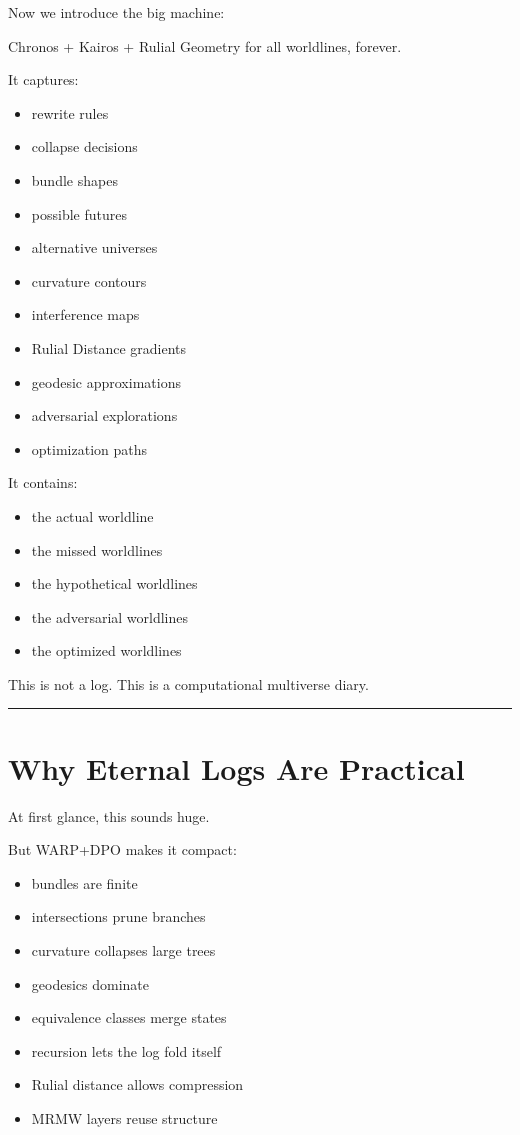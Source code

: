 Now we introduce the big machine:

Chronos + Kairos + Rulial Geometry for all worldlines, forever.

It captures:

\begin{itemize}
\tightlist
\item
  rewrite rules
\item
  collapse decisions
\item
  bundle shapes
\item
  possible futures
\item
  alternative universes
\item
  curvature contours
\item
  interference maps
\item
  Rulial Distance gradients
\item
  geodesic approximations
\item
  adversarial explorations
\item
  optimization paths
\end{itemize}

It contains:

\begin{itemize}
\tightlist
\item
  the actual worldline
\item
  the missed worldlines
\item
  the hypothetical worldlines
\item
  the adversarial worldlines
\item
  the optimized worldlines
\end{itemize}

This is not a log. This is a computational multiverse diary.

\begin{center}\rule{0.5\linewidth}{0.5pt}\end{center}

\section{Why Eternal Logs Are
Practical}\label{why-eternal-logs-are-practical}

At first glance, this sounds huge.

But WARP+DPO makes it compact:

\begin{itemize}
\tightlist
\item
  bundles are finite
\item
  intersections prune branches
\item
  curvature collapses large trees
\item
  geodesics dominate
\item
  equivalence classes merge states
\item
  recursion lets the log fold itself
\item
  Rulial distance allows compression
\item
  MRMW layers reuse structure
\end{itemize}

